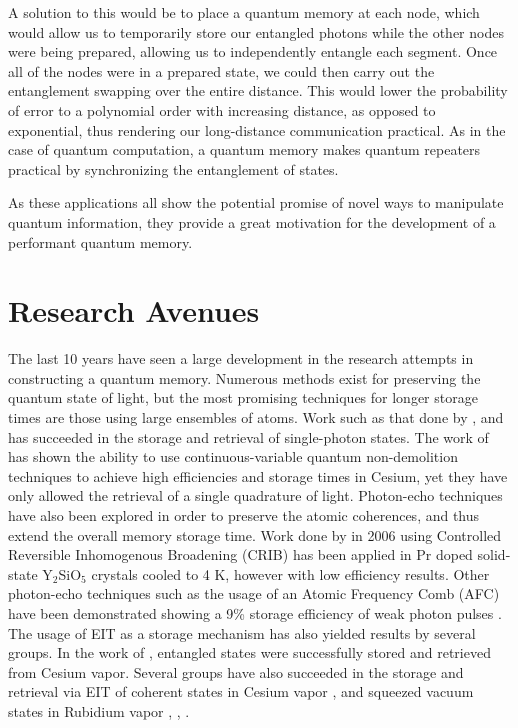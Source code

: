 A solution to this would be to place a quantum memory at each node, which would allow us to temporarily store our entangled photons while the other nodes were being prepared, allowing us to independently entangle each segment.  Once all of the nodes were in a prepared state, we could then carry out the entanglement swapping over the entire distance.  This would lower the probability of error to a polynomial order with increasing distance, as opposed to exponential, thus rendering our long-distance communication practical.  As in the case of quantum computation, a quantum memory makes quantum repeaters practical by synchronizing the entanglement of states.

As these applications all show the potential promise of novel ways to manipulate quantum information, they provide a great motivation for the development of a performant quantum memory.



\section{Research Avenues} 

The last 10 years have seen a large development in the research attempts in
constructing a quantum memory.  Numerous methods exist for preserving the
quantum state of light, but the most promising techniques for longer storage
times are those using large ensembles of atoms.  Work such as that done by
\cite{Kuzmich05}, and \cite{Lukin05} has succeeded in the storage and retrieval of single-photon states.  The work of \cite{Polzik04} has shown the ability to use continuous-variable quantum non-demolition techniques to achieve high efficiencies and storage times in Cesium, yet they have only allowed the retrieval of a single quadrature of light.  Photon-echo techniques have also been explored in order to preserve the atomic coherences, and thus extend the overall memory storage time.  Work done by \cite{PhysRevLett.96.043602} in 2006 using Controlled Reversible Inhomogenous Broadening (CRIB) has been applied in Pr doped solid-state Y$_2$SiO$_5$ crystals cooled to 4 K, however with low efficiency results.  Other photon-echo techniques such as the usage of an Atomic Frequency Comb (AFC) have been demonstrated showing a 9\% storage efficiency of weak photon pulses \cite{chaneliere2010efficient}.  The usage of EIT as a storage mechanism has also yielded results by several groups.  In the work of \cite{choi2008mapping}, entangled states were successfully stored and retrieved from Cesium vapor. Several groups have also succeeded in the storage and retrieval via EIT of coherent states in Cesium vapor \cite{CviklinskiPhD}, and squeezed vacuum states in Rubidium vapor \cite{Lvovsky08}, \cite{Kozuma08}, \cite{Kozuma09}.



